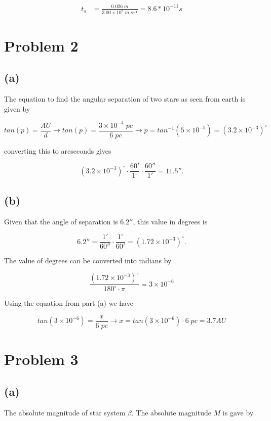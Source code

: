 \documentclass[11pt]{article}
\begin{document}
\begin{align*}
t_{s} &= \frac{0.026 \; m}{3.00\times10^{8} \; m \; s^{-1}} = 8.6*10^{-11} s
\end{align*}

\clearpage

\section*{Problem 2}
\subsection*{(a)}

The equation to find the angular separation of two stars as seen from earth is given by

$$
tan(p) = \frac{AU}{d} \rightarrow tan(p) = \frac{3\times10^{-4}\; pc}{6 \; pc} \rightarrow  p = tan^{-1}(5\times10^{-5}) = (3.2\times10^{-3})^{\circ}
$$

converting this to arcseconds gives

$$
(3.2\times10^{-3})^{\circ} \cdot \frac{60'}{1^{\circ}} \cdot \frac{60''}{1'} = 11.5''.
$$

\subsection*{(b)}

Given that the angle of separation is $6.2''$, this value in degrees is

$$
6.2'' = \frac{1'}{60''} \cdot \frac{1^{\circ}}{60'} = (1.72\times10^{-3})^{\circ}.
$$

The value of degrees can be converted into radians by

$$
\frac{(1.72\times10^{-3})^{\circ}}{180^{\circ} \cdot \pi} = 3\times10^{-6}
$$

Using the equation from part (a) we have

$$
tan(3\times10^{-6}) = \frac{x}{6 \; pc} \rightarrow x = tan(3\times10^{-6}) \cdot 6 \; pc = 3.7 AU
$$

\clearpage

\section*{Problem 3}
\subsection*{(a)}
The absolute magnitude of star system $\beta$. The absolute magnitude $M$ is gave by 
\end{document}
